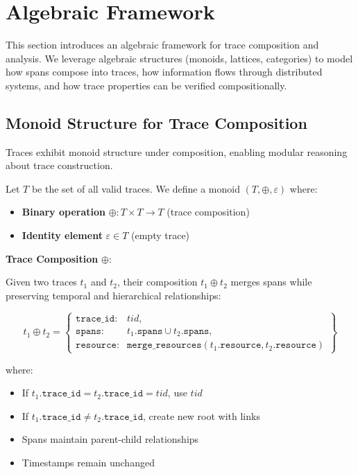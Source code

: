 
\section{Algebraic Framework}
\label{sec:algebraic}

This section introduces an algebraic framework for trace composition and analysis. We leverage algebraic structures (monoids, lattices, categories) to model how spans compose into traces, how information flows through distributed systems, and how trace properties can be verified compositionally.

\subsection{Monoid Structure for Trace Composition}
\label{sec:monoid}

Traces exhibit monoid structure under composition, enabling modular reasoning about trace construction.

\begin{definition}
\label{def:trace-monoid}
Let $T$ be the set of all valid traces. We define a monoid $(T, \oplus, \varepsilon)$ where:
\begin{itemize}
\item \textbf{Binary operation} $\oplus: T \times T \rightarrow T$ (trace composition)
\item \textbf{Identity element} $\varepsilon \in T$ (empty trace)
\end{itemize}
\end{definition}

\textbf{Trace Composition} $\oplus$:

Given two traces $t_1$ and $t_2$, their composition $t_1 \oplus t_2$ merges spans while preserving temporal and hierarchical relationships:

\[
t_1 \oplus t_2 = \left\{\begin{array}{ll}
  \texttt{trace\_id}: & tid, \\
  \texttt{spans}: & t_1.\texttt{spans} \cup t_2.\texttt{spans}, \\
  \texttt{resource}: & \texttt{merge\_resources}(t_1.\texttt{resource}, t_2.\texttt{resource})
\end{array}\right\}
\]

where:
\begin{itemize}
\item If $t_1.\texttt{trace\_id} = t_2.\texttt{trace\_id} = tid$, use $tid$
\item If $t_1.\texttt{trace\_id} \neq t_2.\texttt{trace\_id}$, create new root with links
\item Spans maintain parent-child relationships
\item Timestamps remain unchanged
\end{itemize}

